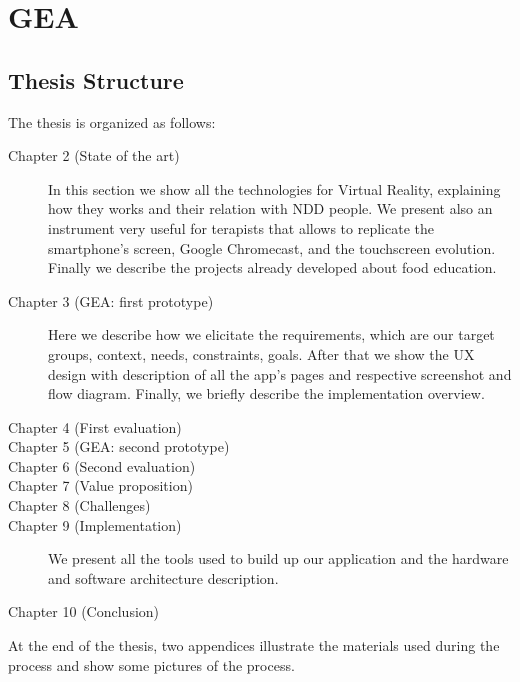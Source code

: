 \section{GEA}
\subsection{Thesis Structure}
The thesis is organized as follows:
\begin{description}
\item[Chapter 2 (State of the art)] In this section we show all the technologies for Virtual Reality, explaining how they works and their relation with NDD people. We present also an instrument very useful for terapists that allows to replicate the smartphone's screen, Google Chromecast, and the touchscreen evolution. Finally we describe the projects already developed about food education.
\item[Chapter 3 (GEA: first prototype)] Here we describe how we elicitate the requirements, which are our target groups, context, needs, constraints, goals. After that we show the UX design with description of all the app's pages and respective screenshot and flow diagram. Finally, we briefly describe the implementation overview.
\item[Chapter 4 (First evaluation)]  
\item[Chapter 5 (GEA: second prototype)]
\item[Chapter 6 (Second evaluation)] 
\item[Chapter 7 (Value proposition)]
\item[Chapter 8 (Challenges)]  
\item[Chapter 9 (Implementation)] We present all the tools used to build up our application and the hardware and software architecture description.
\item[Chapter 10 (Conclusion)]
\end{description}
At the end of the thesis, two appendices illustrate the materials used during the process
and show some pictures of the process.
 
